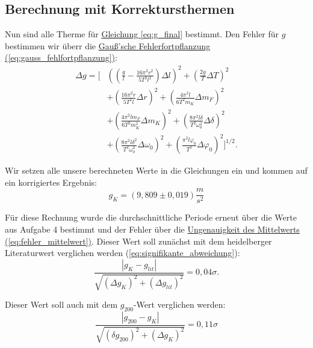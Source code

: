 \subsection{Berechnung mit Korrektursthermen}
Nun sind alle Therme für \hyperref[eq:g_final]{Gleichung \ref*{eq:g_final}} bestimmt. Den Fehler für $g$ bestimmen wir überr die \hyperref[eq:gauss_fehlfortpflanzung]{Gauß'sche Fehlerfortpflanzung (\ref*{eq:gauss_fehlfortpflanzung})}:
\begin{align*}
    \Delta g = \Bigg[
    &\left( \left(\frac{g}{l} - \frac{16\pi^2 r^2}{5T^2 l^2}\right)\Delta l \right)^2
    + \left( \frac{2g}{T}\Delta T \right)^2 \\
    &+ \left( \frac{16\pi^2 r}{5T^2 l}\Delta r \right)^2
    + \left( \frac{4\pi^2 l}{6T^2 m_K}\Delta m_F \right)^2 \\
    &+ \left( \frac{4\pi^2 l m_F}{6T^2 m_K^2}\Delta m_K \right)^2
    + \left( \frac{8\pi^2 l\delta}{T^2 \omega_0^2}\Delta\delta \right)^2 \\
    &+ \left( \frac{8\pi^2 l\delta^2}{T^2 \omega_0^3}\Delta\omega_0 \right)^2
    + \left( \frac{\pi^2 l\varphi_0}{T^2}\Delta\varphi_0 \right)^2
    \Bigg]^{1/2}.
\end{align*}

Wir setzen alle unsere berechneten Werte in die Gleichungen ein und kommen auf ein korrigiertes Ergebnis:
\begin{equation}
    \boxed{
        g_K = (9,809 \pm 0,019) \frac{m}{s^2}
    }
\end{equation}

Für diese Rechnung wurde die durchschnittliche Periode erneut über die Werte aus Aufgabe 4 bestimmt und der Fehler über die \hyperref[eq:fehler_mittelwert]{Ungenauigkeit des Mittelwerts (\ref*{eq:fehler_mittelwert})}. Dieser Wert soll zunächst mit dem heidelberger Literaturwert verglichen werden (\ref{eq:signifikante_abweichung}):
\begin{equation}
    \frac{\left| g_K - g_{lit} \right|}{\sqrt{(\Delta g_K)^2 + (\Delta g_{lit})^2}} = 0,04\sigma.
\end{equation}

Dieser Wert soll auch mit dem $g_{200}$-Wert verglichen werden:
\begin{equation}
\frac{\left| g_{200} - g_K \right|}{\sqrt{(\delta g_{200})^2 + (\Delta g_K)^2}} = 0,11 \sigma
\end{equation}

